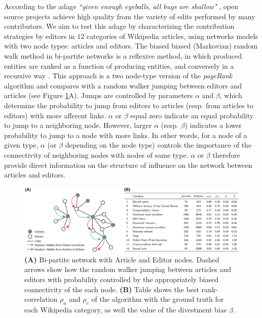 \documentclass[letterpaper,9pt,a4paper]{article}
\begin{document}
\vspace{0.05cm}
According to the adage {\it ``given enough eyeballs, all bugs are shallow"} \cite{raymond1999}, open source projects achieve high quality from the variety of edits performed by many contributors. We aim to test this adage by characterizing the contribution strategies by editors in $12$ categories of Wikipedia articles, using networks models with two node types: articles and editors. The biased biased (Markovian) random walk method in bi-partite networks \cite{caldarelli2012network} is a reflexive method, in which produced entities are ranked as a function of producing entities, and conversely in a recursive way \cite{hidalgo2009}. This approach is a two node-type version of the {\it pageRank} algorithm \cite{page1999pagerank} and compares with a random walker jumping between editors and articles (see Figure \ref{fig1}A). Jumps are controlled by parameters $\alpha$ and $\beta$, which determine the probability to jump from editors to articles (resp. from articles to editors) with more afferent links. $\alpha$ or $\beta$ equal zero indicate an equal probability to jump to a neighboring node. However, larger $\alpha$ (resp. $\beta$) indicates a lower probability to jump to a node with more links. In other words, for a node of a given type, $\alpha$ (or $\beta$ depending on the node type) controls the importance of the connectivity of neighboring nodes with nodes of same type. $\alpha$ or $\beta$ therefore provide direct information on the structure of influence on the network between articles and editors.

\begin{figure}[h]
\centering
\includegraphics[width=1.\columnwidth]{Figures/figure_abstract.eps}
\caption{\footnotesize {\bf (A)} Bi-partite network with Article and Editor nodes. Dashed arrows show how the random walker jumping between articles and editors with  probability controlled by the appropriately biased connectivity of the each node. {\bf (B)} Table shows the best rank-correlation $\rho_a$ and $\rho_e$ of the algorithm with the ground truth for each Wikipedia category, as well the value of the divestment bias $\beta$.}
\label{fig1}
\end{figure}
\end{document}
